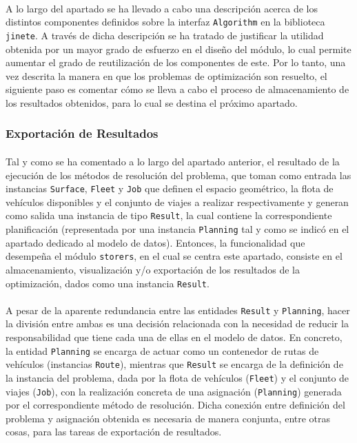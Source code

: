 \documentclass{subfiles}
\begin{document}
          \paragraph{}
          A lo largo del apartado se ha llevado a cabo una descripción acerca de los distintos componentes definidos sobre la interfaz \texttt{Algorithm} en la biblioteca \texttt{jinete}. A través de dicha descripción se ha tratado de justificar la utilidad obtenida por un mayor grado de esfuerzo en el diseño del módulo, lo cual permite aumentar el grado de reutilización de los componentes de este. Por lo tanto, una vez descrita la manera en que los problemas de optimización son resuelto, el siguiente paso es comentar cómo se lleva a cabo el proceso de almacenamiento de los resultados obtenidos, para lo cual se destina el próximo apartado.

        \subsubsection{Exportación de Resultados}
        \label{sec:implementation_components_exportation}

          \paragraph{}
          Tal y como se ha comentado a lo largo del apartado anterior, el resultado de la ejecución de los métodos de resolución del problema, que toman como entrada las instancias \texttt{Surface}, \texttt{Fleet} y \texttt{Job} que definen el espacio geométrico, la flota de vehículos disponibles y el conjunto de viajes a realizar respectivamente y generan como salida una instancia de tipo \texttt{Result}, la cual contiene la correspondiente planificación (representada por una instancia \texttt{Planning} tal y como se indicó en el apartado dedicado al modelo de datos). Entonces, la funcionalidad que desempeña el módulo \texttt{storers}, en el cual se centra este apartado, consiste en el almacenamiento, visualización y/o exportación de los resultados de la optimización, dados como una instancia \texttt{Result}.

          \paragraph{}
          A pesar de la aparente redundancia entre las entidades \texttt{Result} y \texttt{Planning}, hacer la división entre ambas es una decisión relacionada con la necesidad de reducir la responsabilidad que tiene cada una de ellas en el modelo de datos. En concreto, la entidad \texttt{Planning} se encarga de actuar como un contenedor de rutas de vehículos (instancias \texttt{Route}), mientras que \texttt{Result} se encarga de  la definición de la instancia del problema, dada por la flota de vehículos (\texttt{Fleet}) y el conjunto de viajes (\texttt{Job}), con la realización concreta de una asignación (\texttt{Planning}) generada por el correspondiente método de resolución. Dicha conexión entre definición del problema y asignación obtenida es necesaria de manera conjunta, entre otras cosas, para las tareas de exportación de resultados.
\end{document}
